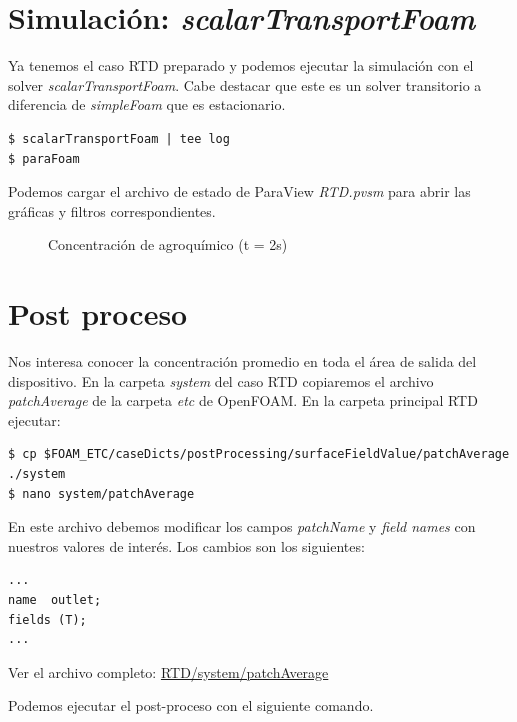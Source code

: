 \documentclass{article}
\begin{document}
\section{Simulación: \textit{scalarTransportFoam}}
Ya tenemos el caso RTD preparado y podemos ejecutar la simulación con el solver \textit{scalarTransportFoam}. Cabe destacar que este es un solver transitorio a diferencia de \textit{simpleFoam} que es estacionario.

\begin{lstlisting}
$ scalarTransportFoam | tee log
$ paraFoam
\end{lstlisting}

Podemos cargar el archivo de estado de ParaView \textit{RTD.pvsm} para abrir las gráficas y filtros correspondientes.

\begin{figure}[h!]
	\centering
	\caption{Concentración de agroquímico (t = 2s)}
	\label{fig:campo_t}
\end{figure}

\newpage
\section{Post proceso}
Nos interesa conocer la concentración promedio en toda el área de salida del dispositivo. En la carpeta \textit{system} del caso RTD copiaremos el archivo \textit{patchAverage} de la carpeta \textit{etc} de OpenFOAM. En la carpeta principal RTD ejecutar:

\begin{lstlisting}
$ cp $FOAM_ETC/caseDicts/postProcessing/surfaceFieldValue/patchAverage ./system
$ nano system/patchAverage
\end{lstlisting}

En este archivo debemos modificar los campos \textit{patchName} y \textit{field names} con nuestros valores de interés. Los cambios son los siguientes:
\begin{lstlisting}
...
name  outlet;
fields (T);
...
\end{lstlisting}

\noindent Ver el archivo completo: 
\href{https://github.com/guillerolle/casos_cfd/blob/master/01/RTD/system/patchAverage}{RTD/system/patchAverage}
\bigskip

%

Podemos ejecutar el post-proceso con el siguiente comando.
\end{document}
